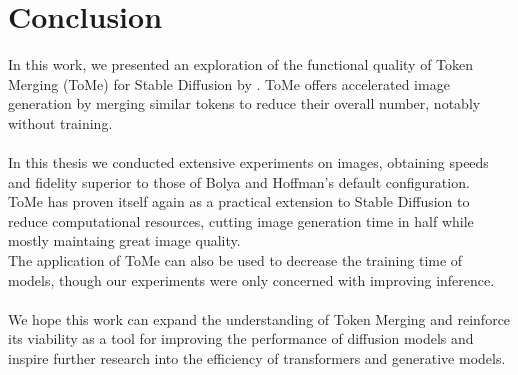 \section{Conclusion}
In this work, we presented an exploration of the functional quality of Token Merging (ToMe) for Stable Diffusion by \cite{bolya2023tomesd}. ToMe offers accelerated image generation by merging similar tokens to reduce their overall number, notably without training.\\
\\
In this thesis we conducted extensive experiments on images, obtaining speeds and fidelity superior to those of Bolya and Hoffman's default configuration.\\
ToMe has proven itself again as a practical extension to Stable Diffusion to reduce computational resources, cutting image generation time in half while mostly maintaing great image quality.\\
The application of ToMe can also be used to decrease the training time of models, though our experiments were only concerned with improving inference.\\
\\
We hope this work can expand the understanding of Token Merging and reinforce its viability as a tool for improving the performance of diffusion models and inspire further research into the efficiency of transformers and generative models.\\



